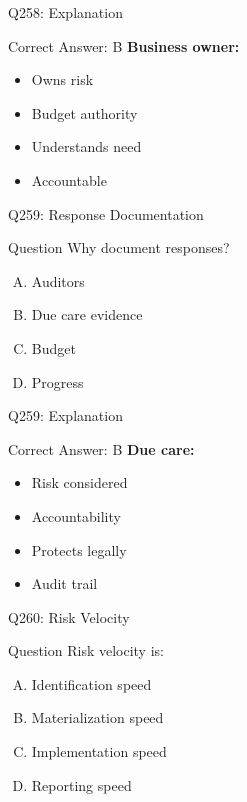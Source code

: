 \documentclass{beamer}
\begin{document}
	\begin{frame}{Q258: Explanation}
		\begin{block}{Correct Answer: B}
			\textbf{Business owner:}
			\begin{itemize}
				\item Owns risk
				\item Budget authority
				\item Understands need
				\item Accountable
			\end{itemize}
		\end{block}
	\end{frame}
	
	\begin{frame}{Q259: Response Documentation}
		\begin{block}{Question}
			Why document responses?
		\end{block}
		\begin{enumerate}[(A)]
			\item Auditors
			\item Due care evidence
			\item Budget
			\item Progress
		\end{enumerate}
	\end{frame}
	
	\begin{frame}{Q259: Explanation}
		\begin{block}{Correct Answer: B}
			\textbf{Due care:}
			\begin{itemize}
				\item Risk considered
				\item Accountability
				\item Protects legally
				\item Audit trail
			\end{itemize}
		\end{block}
	\end{frame}
	
	\begin{frame}{Q260: Risk Velocity}
		\begin{block}{Question}
			Risk velocity is:
		\end{block}
		\begin{enumerate}[(A)]
			\item Identification speed
			\item Materialization speed
			\item Implementation speed
			\item Reporting speed
		\end{enumerate}
	\end{frame}
	
\end{document}
